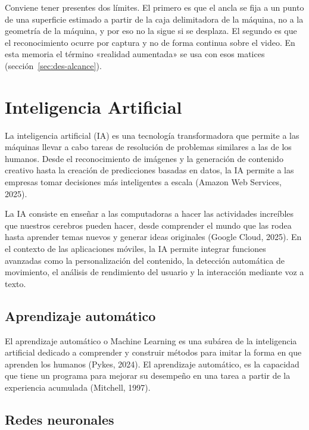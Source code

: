 Conviene tener presentes dos límites. El primero es que el ancla se fija a un
punto de una superficie estimado a partir de la caja delimitadora de la
máquina, no a la geometría de la máquina, y por eso no la sigue si se desplaza.
El segundo es que el reconocimiento ocurre por captura y no de forma continua
sobre el video. En esta memoria el término «realidad aumentada» se usa con
esos matices (sección~\ref{sec:des-alcance}).


\section{Inteligencia Artificial}
\label{sec:inteligencia-artificial}

La inteligencia artificial (IA) es una tecnología transformadora que permite a
las máquinas llevar a cabo tareas de resolución de problemas similares a las de
los humanos. Desde el reconocimiento de imágenes y la generación de contenido
creativo hasta la creación de predicciones basadas en datos, la IA permite a
las empresas tomar decisiones más inteligentes a escala (Amazon Web Services, 2025).

La IA consiste en enseñar a las computadoras a hacer las actividades increíbles
que nuestros cerebros pueden hacer, desde comprender el mundo que las rodea
hasta aprender temas nuevos y generar ideas originales (Google Cloud, 2025). En el
contexto de las aplicaciones móviles, la IA permite integrar funciones
avanzadas como la personalización del contenido, la detección automática de
movimiento, el análisis de rendimiento del usuario y la interacción mediante
voz a texto.

\subsection{Aprendizaje automático}

El aprendizaje automático o Machine Learning es una subárea de la inteligencia
artificial dedicado a comprender y construir métodos para imitar la forma en
que aprenden los humanos (Pykes, 2024). El aprendizaje automático, es la
capacidad que tiene un programa para mejorar su desempeño en una tarea a partir
de la experiencia acumulada (Mitchell, 1997).

\subsection{Redes neuronales}

